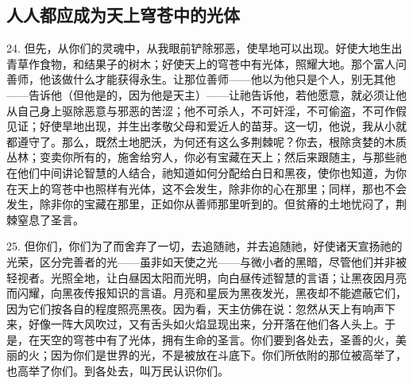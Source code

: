 \subsection{人人都应成为天上穹苍中的光体}

24. 但先，从你们的灵魂中，从我眼前铲除邪恶，使旱地可以出现。好使大地生出青草作食物，和结果子的树木；好使天上的穹苍中有光体，照耀大地。那个富人问善师，他该做什么才能获得永生。让那位善师——他以为他只是个人，别无其他——告诉他（但他是的，因为他是天主）——让祂告诉他，若他愿意，就必须让他从自己身上驱除恶意与邪恶的苦涩；他不可杀人，不可奸淫，不可偷盗，不可作假见证；好使旱地出现，并生出孝敬父母和爱近人的苗芽。这一切，他说，我从小就都遵守了。那么，既然土地肥沃，为何还有这么多荆棘呢？你去，根除贪婪的木质丛林；变卖你所有的，施舍给穷人，你必有宝藏在天上；然后来跟随主，与那些祂在他们中间讲论智慧的人结合，祂知道如何分配给白日和黑夜，使你也知道，为你在天上的穹苍中也照样有光体，这不会发生，除非你的心在那里；同样，那也不会发生，除非你的宝藏在那里，正如你从善师那里听到的。但贫瘠的土地忧闷了，荆棘窒息了圣言。\par

25. 但你们，你们为了而舍弃了一切，去追随祂，并去追随祂，好使诸天宣扬祂的光荣，区分完善者的光——虽非如天使之光——与微小者的黑暗，尽管他们并非被轻视者。光照全地，让白昼因太阳而光明，向白昼传述智慧的言语；让黑夜因月亮而闪耀，向黑夜传报知识的言语。月亮和星辰为黑夜发光，黑夜却不能遮蔽它们，因为它们按各自的程度照亮黑夜。因为看，天主仿佛在说：忽然从天上有响声下来，好像一阵大风吹过，又有舌头如火焰显现出来，分开落在他们各人头上。于是，在天空的穹苍中有了光体，拥有生命的圣言。你们要到各处去，圣善的火，美丽的火；因为你们是世界的光，不是被放在斗底下。你们所依附的那位被高举了，也高举了你们。到各处去，叫万民认识你们。\par


